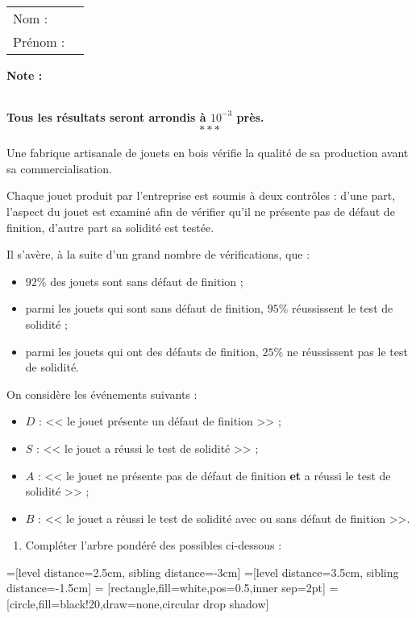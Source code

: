 \documentclass[10pt,french]{book}
\newcommand\competences{
\setcounter{exo}{0}
\begin{tabular}{ll} Nom : \\[5pt] Prénom : \end{tabular}
\hfill
\textbf{Note :}\renewcommand\arraystretch{2.3}
\begin{tabularx}{0.18\linewidth}{|X|}
\hline
\slashbox{\Huge\bfseries\phantom{10}}{\Huge\bfseries 10}\\
\hline
\end{tabularx}\renewcommand\arraystretch{1}\medskip
}
\begin{document}
\competences

\textbf{Tous les résultats seront arrondis à $10^{-3}$ près.}\[***\]

\exo Une fabrique artisanale de jouets en bois vérifie la qualité de sa production avant sa commercialisation.\par
Chaque jouet produit par l'entreprise est soumis à deux contrôles : d'une part, l'aspect du jouet est examiné afin de vérifier qu'il ne présente pas de défaut de finition, d'autre part sa solidité est testée.\par
Il s'avère, à la suite d'un grand nombre de vérifications, que :
\begin{itemize}
    \item $92\%$ des jouets sont sans défaut de finition ;
    \item parmi les jouets qui sont sans défaut de finition, $95\%$ réussissent le test de solidité ;
    \item parmi les jouets qui ont des défauts de finition, $25\%$ ne réussissent pas le test de solidité.
\end{itemize}\medskip

On considère les événements suivants :
\begin{itemize}
    \item $D$ : << le jouet présente un défaut de finition >> ;
    \item $S$ : << le jouet a réussi le test de solidité >> ;
    \item $A$ : << le jouet ne présente pas de défaut de finition \textbf{et} a réussi le test de solidité >> ;
    \item $B$ : << le jouet a réussi le test de solidité avec ou sans défaut de finition >>.
\end{itemize}\medskip

\begin{enumerate}
    \item Compléter l'arbre pondéré des possibles ci-dessous :
\end{enumerate}

=[level distance=2.5cm, sibling distance=-3cm]
=[level distance=3.5cm, sibling distance=-1.5cm]
 = [rectangle,fill=white,pos=0.5,inner sep=2pt]
 = [circle,fill=black!20,draw=none,circular drop shadow]
\end{document}
